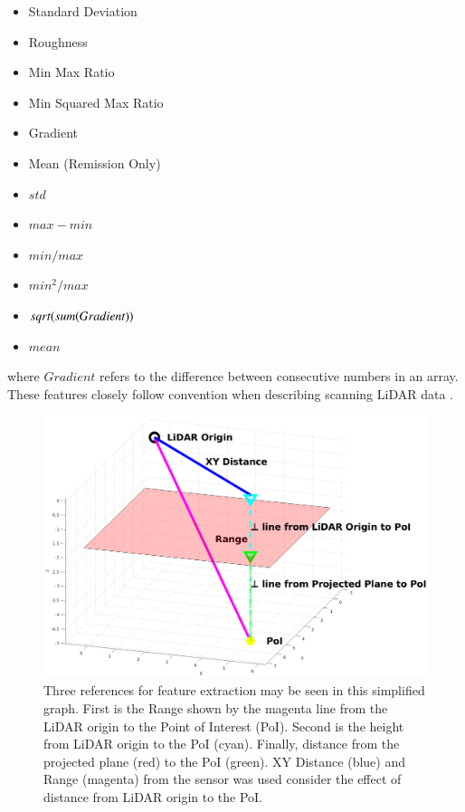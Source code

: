 \documentclass[numbered,pdftex]{ohio-etd}
\begin{document}
{{{{				\begin{multicols}{2}
					\begin{itemize}[itemsep=.1pt]
						\item Standard Deviation
						\item Roughness
						\item Min Max Ratio
						\item Min Squared Max Ratio
						\item Gradient
						\item Mean (Remission Only)
					\end{itemize}
					\vfill\null
					\columnbreak
					\begin{itemize}[itemsep=.1pt]
						\item $std$
						\item $max - min$
						\item $min / max$
						\item $min^2 / max$
						\item $sqrt(sum(Gradient\*))$
						\item $mean$
					\end{itemize}
					\vfill\null
					\label{lst:feature_list}
				\end{multicols}
				
				{where $Gradient$ refers to the difference between consecutive numbers in an array. These features closely follow convention when describing scanning LiDAR data \cite{breiman_random_2001}.}
				
				
				\begin{figure}[H]
					\centering
					\includegraphics[width=1\linewidth]{Defense_Images/xy_vs_range}
					\caption[XY vs Range vs Z Height]{Three references for feature extraction may be seen in this simplified graph. First is the Range shown by the magenta line from the LiDAR origin to the Point of Interest (PoI). Second is the height from  LiDAR origin to the PoI (cyan). Finally, distance from the projected plane (red) to the PoI (green). XY Distance (blue) and Range (magenta) from the sensor was used consider the effect of distance from LiDAR origin to the PoI.}
					\label{fig:xy_vs_range}
				\end{figure}
			
}}}}
\end{document}
